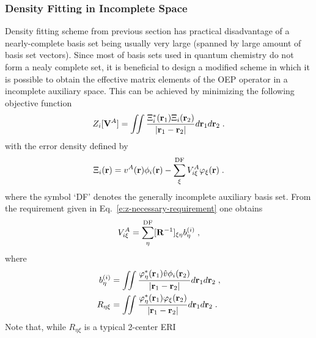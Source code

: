 \subsubsection{Density Fitting in Incomplete Space}

Density fitting scheme from previous section has practical disadvantage of a nearly\hyp{}complete basis set
being usually very large (spanned by large amount of basis set vectors). 
Since most of basis sets used in quantum chemistry do not form a nealy complete
set, it is beneficial to design a modified scheme in which it is possible to obtain the effective 
matrix elements of the OEP operator in a incomplete auxiliary space. This can be achieved by minimizing 
the following objective function
%
\begin{equation} \label{e:z-incompl}
	Z_i[{\bf V}^A] = \iint 
        \frac{ \Xi_i^*({\bf r}_1) \Xi_i({\bf r}_2) }{\vert {\bf r}_1 - {\bf r}_2 \vert}  
         d{\bf r}_1 d{\bf r}_2  \;.
\end{equation}
%
with the error density defined by
%
\begin{equation}
 \Xi_i({\bf r}) = v^A({\bf r}) \phi_i({\bf r}) - \sum_\xi^{\rm DF} V^A_{i\xi} \varphi_\xi({\bf r}) \;.
\end{equation}
%
where the symbol `DF' denotes the generally incomplete auxiliary basis set.
From the requirement given in Eq.~\eqref{e:z-necessary-requirement}
one obtains
%
\begin{equation} \label{e:v-noncompl}
  V^A_{i\xi} = \sum_\eta^{\rm DF} [{\bf R}^{-1}]_{\xi\eta} b^{(i)}_\eta \;,
\end{equation}
%
where 
%
\begin{subequations}
\begin{align}
 b^{(i)}_\eta &= \iint 
                       \frac{ \varphi^*_\eta({\bf r}_1) \hat{v} \phi_i({\bf r}_2) } 
                            {\vert {\bf r}_1 - {\bf r}_2\vert}  
                 d{\bf r}_1 d{\bf r}_2 \;, \\
 R_{\eta\xi}  &= \iint 
                       \frac{ \varphi^*_\eta({\bf r}_1) \varphi_\xi({\bf r}_2) } 
                            {\vert {\bf r}_1 - {\bf r}_2\vert}  
                 d{\bf r}_1 d{\bf r}_2 \;.
\end{align}
\end{subequations}
%
Note that, while $R_{\eta\xi}$ is a typical 2\hyp{}center ERI 
